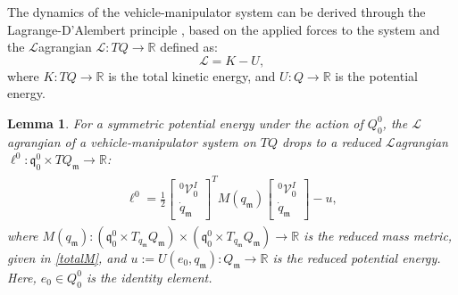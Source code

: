 \documentclass[lettersize,journal]{IEEEtran}
\def \q  {\mathfrak{q}}
\def \m  {\mathfrak{m}}
\def \V {\mathcal{V}}
\def \L {\mathcal{L}}
\newtheorem{lemma}{Lemma}
\theoremstyle{remark}
\begin{document}
The dynamics of the vehicle-manipulator system can be derived through the Lagrange-D'Alembert principle%
, based on the applied forces to the system and the $\mathcal{L}$agrangian $\mathcal{L}\colon TQ \rightarrow \mathbb{R}$ defined as: %
\begin{equation}
    \mathcal{L}=K-U,
    \label{lagrangianfirst}
\end{equation}
where $K\colon TQ\rightarrow \mathbb{R}$ is the total kinetic energy, and $U\colon Q\rightarrow\mathbb{R}$ is the potential energy.
\begin{lemma}
For a symmetric potential energy under the action of $Q^0_0$, the $\mathcal{L}$agrangian of a vehicle-manipulator system on $TQ$ drops to a reduced $\L$agrangian $\ell^0\colon\q^0_0 \times TQ_\m\rightarrow \mathbb{R}$:
\begin{align}
\begin{split}
    \ell^0=\frac{1}{2}\begin{bmatrix}^0\V^I_0 \\ \dot{q}_\mathfrak{m}\end{bmatrix}^T M(q_\mathfrak{m}) \begin{bmatrix}^0\V^I_0\\\dot{q}_\mathfrak{m}\end{bmatrix}-u,
\end{split}
\label{lagrangianbig}
\end{align}
where $M(q_{\m})\colon (\q^0_0 \times T_{q_\m}Q_\m)\times (\q^0_0 \times T_{q_\m}Q_\m)\rightarrow \mathbb{R}$ is the reduced mass metric, given in \eqref{totalM}, and $u:=U(e_0,q_{\m})\colon Q_\m\rightarrow \mathbb{R}$ is the reduced potential energy. Here, $e_0 \in Q^0_0$ is the identity element.
\end{lemma} 
\end{document}
